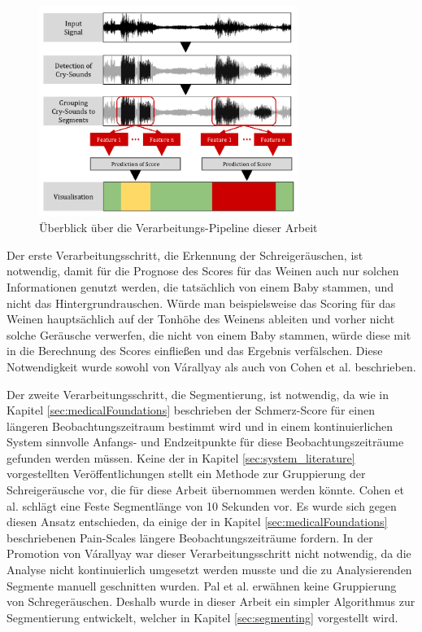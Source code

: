 \begin{figure}[h]
	\centering
	\includegraphics[width=0.75\textwidth]{bilder/konzept03.png}
	\caption{Überblick über die Verarbeitungs-Pipeline dieser Arbeit}
	\label{img:architecture-overview}
\end{figure}

Der erste Verarbeitungsschritt, die Erkennung der Schreigeräuschen, ist notwendig, damit für die Prognose des Scores für das Weinen auch nur solchen Informationen genutzt werden, die tatsächlich von einem Baby stammen, und nicht das Hintergrundrauschen. Würde man beispielsweise das Scoring für das Weinen hauptsächlich auf der Tonhöhe des Weinens ableiten und vorher nicht solche Geräusche verwerfen, die nicht von einem Baby stammen, würde diese mit in die Berechnung des Scores einfließen und das Ergebnis verfälschen. Diese Notwendigkeit wurde sowohl von Várallyay \cite{cry_thesis} als auch von Cohen et al. \cite{cohenCry} beschrieben. 


Der zweite Verarbeitungsschritt, die Segmentierung, ist notwendig, da wie in Kapitel \ref{sec:medicalFoundations} beschrieben der Schmerz-Score für einen längeren Beobachtungszeitraum bestimmt wird und in einem kontinuierlichen System sinnvolle Anfangs- und Endzeitpunkte für diese Beobachtungszeiträume gefunden werden müssen. Keine der in Kapitel \ref{sec:system_literature} vorgestellten Veröffentlichungen stellt ein Methode zur Gruppierung der Schreigeräusche vor, die für diese Arbeit übernommen werden könnte. Cohen et al. \cite{cohenCry} schlägt eine Feste Segmentlänge von 10 Sekunden vor. Es wurde sich gegen diesen Ansatz entschieden, da einige der in Kapitel \ref{sec:medicalFoundations} beschriebenen Pain-Scales längere Beobachtungszeiträume fordern. In der Promotion von Várallyay \cite{cry_thesis} war dieser Verarbeitungsschritt nicht notwendig, da die Analyse nicht kontinuierlich umgesetzt werden musste und die zu Analysierenden Segmente manuell geschnitten wurden. Pal et al. \cite{palEmotion} erwähnen keine Gruppierung von Schregeräuschen. Deshalb wurde in dieser Arbeit ein simpler Algorithmus zur Segmentierung entwickelt, welcher in Kapitel \ref{sec:segmenting} vorgestellt wird.

